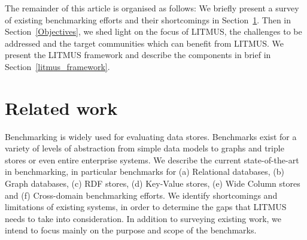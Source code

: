\documentclass{llncs}
\begin{document}
    
    
The remainder of this article is organised as follows: 
We briefly present a survey of existing benchmarking efforts and their shortcomings in Section~\ref{relwork}. 
Then in Section~\ref{Objectives}, we shed light on the focus of LITMUS, the challenges to be addressed and the target communities which can benefit from LITMUS. 
We present the LITMUS framework and describe the components in brief in Section~\ref{litmus_framework}.  



\section{Related work}\label{relwork}

Benchmarking is widely used for evaluating data stores. 
Benchmarks exist for a variety of levels of abstraction from simple data models to graphs and triple stores or even entire enterprise systems.
We describe the current state-of-the-art in benchmarking, in particular benchmarks for (a) Relational databases, (b) Graph databases, (c) RDF stores, (d) Key-Value stores, (e) Wide Column stores and (f) Cross-domain benchmarking efforts.
We identify shortcomings and limitations of existing systems, in order to determine the gaps that LITMUS needs to take into consideration.
In addition to surveying existing work, we intend to focus mainly on the purpose and scope of the benchmarks.
    
\end{document}
